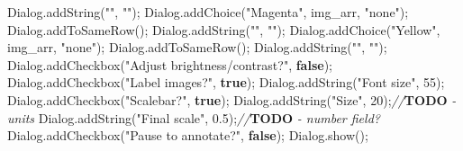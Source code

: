 \documentclass[
  12pt,
  a4paper,
]{book}
\newenvironment{Shaded}{}{}
\newcommand{\AlertTok}[1]{\textcolor[rgb]{1.00,0.00,0.00}{\textbf{#1}}}
\newcommand{\CommentTok}[1]{\textcolor[rgb]{0.38,0.63,0.69}{\textit{#1}}}
\newcommand{\DecValTok}[1]{\textcolor[rgb]{0.25,0.63,0.44}{#1}}
\newcommand{\FloatTok}[1]{\textcolor[rgb]{0.25,0.63,0.44}{#1}}
\newcommand{\KeywordTok}[1]{\textcolor[rgb]{0.00,0.44,0.13}{\textbf{#1}}}
\newcommand{\NormalTok}[1]{#1}
\newcommand{\OperatorTok}[1]{\textcolor[rgb]{0.40,0.40,0.40}{#1}}
\newcommand{\StringTok}[1]{\textcolor[rgb]{0.25,0.44,0.63}{#1}}
\begin{document}
\begin{Shaded}
\begin{Highlighting}[]
\NormalTok{Dialog}\OperatorTok{.}\NormalTok{addString}\OperatorTok{(}\StringTok{""}\OperatorTok{,} \StringTok{""}\OperatorTok{);}
\NormalTok{Dialog}\OperatorTok{.}\NormalTok{addChoice}\OperatorTok{(}\StringTok{"Magenta"}\OperatorTok{,}\NormalTok{ img\_arr}\OperatorTok{,} \StringTok{"none"}\OperatorTok{);}
\NormalTok{Dialog}\OperatorTok{.}\NormalTok{addToSameRow}\OperatorTok{();}
\NormalTok{Dialog}\OperatorTok{.}\NormalTok{addString}\OperatorTok{(}\StringTok{""}\OperatorTok{,} \StringTok{""}\OperatorTok{);}
\NormalTok{Dialog}\OperatorTok{.}\NormalTok{addChoice}\OperatorTok{(}\StringTok{"Yellow"}\OperatorTok{,}\NormalTok{ img\_arr}\OperatorTok{,} \StringTok{"none"}\OperatorTok{);}
\NormalTok{Dialog}\OperatorTok{.}\NormalTok{addToSameRow}\OperatorTok{();}
\NormalTok{Dialog}\OperatorTok{.}\NormalTok{addString}\OperatorTok{(}\StringTok{""}\OperatorTok{,} \StringTok{""}\OperatorTok{);}
\NormalTok{Dialog}\OperatorTok{.}\NormalTok{addCheckbox}\OperatorTok{(}\StringTok{"Adjust brightness/contrast?"}\OperatorTok{,} \KeywordTok{false}\OperatorTok{);}
\NormalTok{Dialog}\OperatorTok{.}\NormalTok{addCheckbox}\OperatorTok{(}\StringTok{"Label images?"}\OperatorTok{,} \KeywordTok{true}\OperatorTok{);}
\NormalTok{Dialog}\OperatorTok{.}\NormalTok{addString}\OperatorTok{(}\StringTok{"Font size"}\OperatorTok{,} \DecValTok{55}\OperatorTok{);}
\NormalTok{Dialog}\OperatorTok{.}\NormalTok{addCheckbox}\OperatorTok{(}\StringTok{"Scalebar?"}\OperatorTok{,} \KeywordTok{true}\OperatorTok{);}
\NormalTok{Dialog}\OperatorTok{.}\NormalTok{addString}\OperatorTok{(}\StringTok{"Size"}\OperatorTok{,} \DecValTok{20}\OperatorTok{);}\CommentTok{//}\AlertTok{TODO}\CommentTok{ {-} units}
\NormalTok{Dialog}\OperatorTok{.}\NormalTok{addString}\OperatorTok{(}\StringTok{"Final scale"}\OperatorTok{,} \FloatTok{0.5}\OperatorTok{);}\CommentTok{//}\AlertTok{TODO}\CommentTok{ {-} number field?}
\NormalTok{Dialog}\OperatorTok{.}\NormalTok{addCheckbox}\OperatorTok{(}\StringTok{"Pause to annotate?"}\OperatorTok{,} \KeywordTok{false}\OperatorTok{);}
\NormalTok{Dialog}\OperatorTok{.}\NormalTok{show}\OperatorTok{();}


\end{Highlighting}
\end{Shaded}
\end{document}
